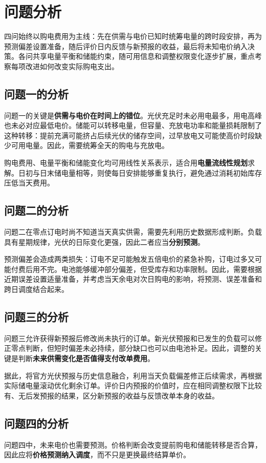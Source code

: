 \section{问题分析}

四问始终以购电费用为主线：先在供需与电价已知时统筹电量的跨时段安排，再为预测偏差设置准备，随后评价日内反馈与新预报的收益，最后将未知电价纳入决策。各问共享电量平衡和储能约束，随可用信息和调整权限变化逐步扩展，重点考察每项改进如何改变实际购电支出。

\subsection{问题一的分析}
问题一的关键是\textbf{供需与电价在时间上的错位}。光伏充足时未必用电最多，用电高峰也未必对应最低电价。储能可以转移电量，但容量、充放电功率和能量损耗限制了这种转移：提前充满可能挤占后续光伏的储存空间，过早放电又可能使高价时段缺少可用电量。因此，需要统筹全天的购电与充放电。

购电费用、电量平衡和储能变化均可用线性关系表示，适合用\textbf{电量流线性规划}求解。日初与日末储电量相等，则使每日安排能够重复执行，避免通过消耗初始库存压低当天费用。

\subsection{问题二的分析}
问题二在零点订电时尚不知道当天真实供需，需要先利用历史数据形成判断。负载具有星期规律，光伏的日际变化更强，因此二者应当\textbf{分别预测}。

预测偏差会造成两类损失：订电不足可能触发五倍电价的紧急补购，订电过多又可能付费后用不完。电池能够缓冲部分偏差，但受库存和功率限制。因此，需要根据近期误差设置适量准备，并考虑当天余电对次日购电的影响，将预测、误差准备和跨日调度结合起来。

\subsection{问题三的分析}
问题三允许获得新预报后修改尚未执行的订单。新光伏预报和已发生的负载可以修正零点判断，但短时偏差未必持续，部分缺口也可以由电池补足。因此，调整的关键是判断\textbf{未来供需变化是否值得支付改单费用}。

据此，将官方光伏预报与历史信息融合，利用当天负载偏差修正后续需求，再根据实际储电量滚动优化剩余订单。评价日内预报的价值时，应在相同调整权限下比较有、无后发预报的结果，区分新预报的收益与反馈改单本身的收益。

\subsection{问题四的分析}
问题四中，未来电价也需要预测。价格判断会改变提前购电和储能转移是否合算，因此应将\textbf{价格预测纳入调度}，而不只是更换最终结算单价。

